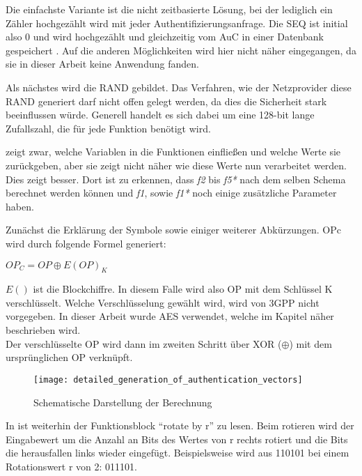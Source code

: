  Die einfachste Variante ist die nicht zeitbasierte Lösung, bei der lediglich ein Zähler hochgezählt
 wird mit jeder Authentifizierungsanfrage. Die SEQ ist initial also 0 und wird hochgezählt und
 gleichzeitig vom \ac{AuC} in einer Datenbank gespeichert \cite{3gpp.33.102}. Auf die anderen
 Möglichkeiten wird hier nicht näher eingegangen, da sie in dieser Arbeit keine Anwendung
 fanden.
 
 Als nächstes wird die \ac{RAND} gebildet. Das Verfahren, wie der Netzprovider diese RAND
 generiert darf nicht offen gelegt werden, da dies die Sicherheit stark beeinflussen würde.
 Generell handelt es sich dabei um eine 128-bit lange Zufallszahl, die für jede Funktion benötigt wird.
 
  zeigt zwar, welche Variablen in die Funktionen einfließen und
 welche Werte sie zurückgeben, aber sie zeigt nicht näher wie diese Werte nun verarbeitet
 werden. Dies zeigt  besser. Dort ist zu erkennen, dass
 \emph{f2} bis \emph{f5*} nach dem selben Schema berechnet werden können und \emph{f1},
 sowie \emph{f1*} noch einige zusätzliche Parameter haben.
 
 Zunächst die Erklärung der Symbole sowie einiger weiterer Abkürzungen. \ac{OPc} wird durch
 folgende Formel generiert:
 \begin{center}
  $OP_{C} = OP \oplus E(OP)_{K}$
 \end{center}
 
 $E()$ ist die Blockchiffre. In diesem Falle wird also \ac{OP} mit dem Schlüssel \ac{K}
 verschlüsselt. Welche Verschlüsselung gewählt wird, wird von 3GPP nicht vorgegeben. In
 dieser Arbeit wurde \ac{AES} verwendet, welche im Kapitel  näher beschrieben wird. \\
 Der verschlüsselte OP wird dann im zweiten Schritt über XOR ($\oplus$) mit dem ursprünglichen
 OP verknüpft.
 
 \begin{figure}[ht]
  \begin{center}
   \texttt{[image: detailed\_generation\_of\_authentication\_vectors]}
  \end{center}
  \caption[Schematische Darstellung der Berechnung der Authentifizierungsvektoren]{Schematische Darstellung der Berechnung \cite{3gpp.33.102}}
  \label{fig:schematisch_milenage}
 \end{figure}
 
 In  ist weiterhin der Funktionsblock ``rotate by r'' zu lesen.
 Beim rotieren wird der Eingabewert um die Anzahl an Bits des Wertes von r rechts rotiert und
 die Bits die herausfallen links wieder eingefügt. Beispielsweise wird aus 110101 bei einem
 Rotationswert r von 2: 011101.
 
